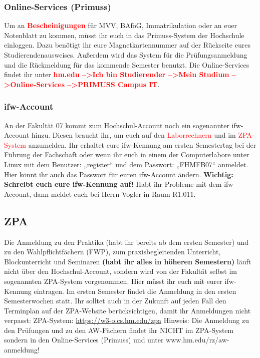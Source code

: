 \subsubsection{Online-Services (Primuss)}
Um an \textcolor{red}{\textbf{Bescheinigungen}} für MVV, BAföG, Immatrikulation oder an euer Notenblatt zu kommen, müsst ihr euch in das Primuss-System der Hochschule einloggen. Dazu benötigt ihr eure Magnetkartennummer auf der Rückseite eures Studierendenausweises. Außerdem wird das System für die Prüfungsanmeldung und die Rückmeldung für das kommende Semester benutzt.\doublebreak
Die Online-Services findet ihr unter \textcolor{red}{\textbf{hm.edu --\textgreater Ich bin Studierender --\textgreater Mein Studium --\textgreater Online-Services --\textgreater PRIMUSS Campus IT}}.

\subsubsection{ifw-Account}

An der Fakultät 07 kommt zum Hochschul-Account noch ein sogenannter ifw-Account hinzu. Diesen braucht ihr, um euch auf den \textcolor{red}{Laborrechnern} und im \textcolor{red}{ZPA-System} anzumelden.\doublebreak
Ihr erhaltet eure ifw-Kennung am ersten Semestertag bei der Führung der Fachschaft oder wenn ihr euch in einem der Computerlabore unter Linux mit dem Benutzer: „register“ und dem Passwort: „FHMFB07“ anmeldet. Hier könnt ihr auch das Passwort für euren ifw-Account ändern. \textbf{Wichtig: Schreibt euch eure ifw-Kennung auf!}\doublebreak
Habt ihr Probleme mit dem ifw-Account, dann meldet euch bei Herrn Vogler in Raum R1.011.

\subsection{ZPA}

Die Anmeldung zu den Praktika (habt ihr bereits ab dem ersten Semester) und zu den Wahlpflichtfächern (FWP), zum praxisbegleitenden Unterricht, Blockunterricht und Seminaren \textbf{(habt ihr alles in höheren Semestern)} läuft nicht über den Hochschul-Account, sondern wird von der Fakultät selbst im sogenannten ZPA-System vorgenommen. Hier müsst ihr euch mit eurer ifw-Kennung eintragen. Im ersten Semester findet die Anmeldung in den ersten Semesterwochen statt. Ihr solltet auch in der Zukunft auf jeden Fall den Terminplan auf der ZPA-Website berücksichtigen, damit ihr Anmeldungen nicht verpasst:\doublebreak
ZPA-System: \url{https://w3-o.cs.hm.edu/zpa}\doublebreak
Hinweis: Die Anmeldung zu den Prüfungen und zu den AW-Fächern findet ihr NICHT im ZPA-System sondern in den Online-Services (Primuss) und unter www.hm.edu/rz/aw-anmeldung!

